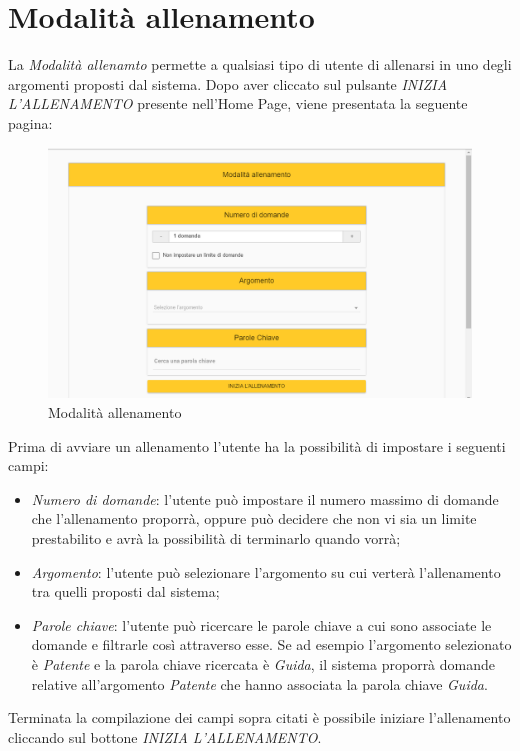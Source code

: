 \newpage
\section{Modalità allenamento}
La \textit{Modalità allenamto} permette a qualsiasi tipo di utente di allenarsi in uno degli argomenti proposti dal sistema. Dopo aver cliccato sul pulsante \textit{INIZIA L'ALLENAMENTO} presente nell'Home Page, viene presentata la seguente pagina:

\label{Modalità allenamento}
\begin{figure}[ht]
	\centering
	\includegraphics[scale=0.45]{img/allenamento.png}
	\caption{Modalità allenamento}
\end{figure}
\FloatBarrier

Prima di avviare un allenamento l'utente ha la possibilità di impostare i seguenti campi:
\begin{itemize}
	\item \textit{Numero di domande}: l'utente può impostare il numero massimo di domande che l'allenamento proporrà, oppure può decidere che non vi sia un limite prestabilito e avrà la possibilità di terminarlo quando vorrà;
	\item \textit{Argomento}: l'utente può selezionare l'argomento su cui verterà l'allenamento tra quelli proposti dal sistema;
	\item \textit{Parole chiave}: l'utente può ricercare le parole chiave a cui sono associate le domande e filtrarle così attraverso esse. Se ad esempio l'argomento selezionato è \textit{Patente} e la parola chiave ricercata è \textit{Guida}, il sistema proporrà domande relative all'argomento \textit{Patente} che hanno associata la parola chiave \textit{Guida}.
\end{itemize}

Terminata la compilazione dei campi sopra citati è possibile iniziare l'allenamento cliccando sul bottone \textit{INIZIA L'ALLENAMENTO}.